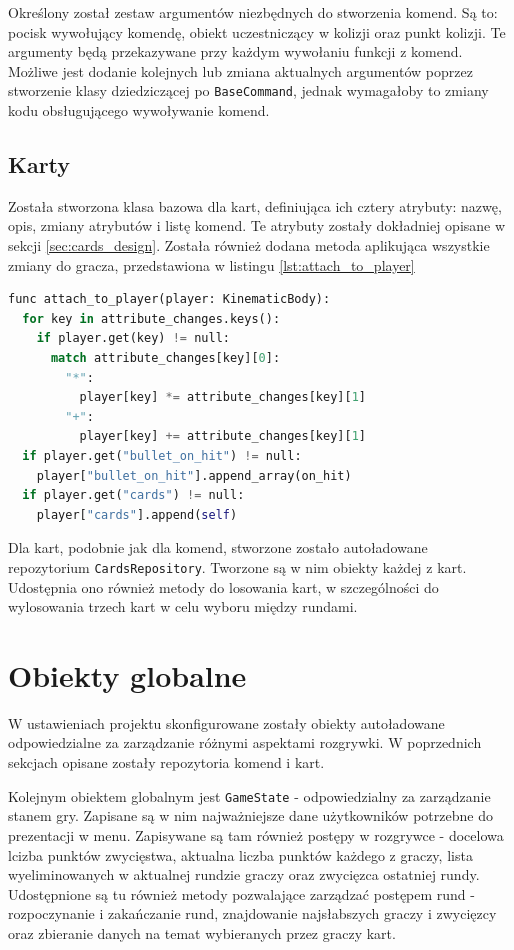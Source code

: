 Określony został zestaw argumentów niezbędnych do stworzenia komend. Są to: pocisk wywołujący komendę, obiekt uczestniczący w kolizji oraz punkt kolizji. Te argumenty będą przekazywane przy każdym wywołaniu funkcji z komend. Możliwe jest dodanie kolejnych lub zmiana aktualnych argumentów poprzez stworzenie klasy dziedziczącej po \texttt{BaseCommand}, jednak wymagałoby to zmiany kodu obsługującego wywoływanie komend.


\subsection{Karty}
Została stworzona klasa bazowa dla kart, definiująca ich cztery atrybuty: nazwę, opis, zmiany atrybutów i listę komend. Te atrybuty zostały dokładniej opisane w sekcji \ref{sec:cards_design}. Została również dodana metoda aplikująca wszystkie zmiany do gracza, przedstawiona w listingu \ref{lst:attach_to_player}

\begin{lstlisting}[language=python,caption=Metoda aplikująca zmiany atrybutów gracza., label=lst:attach_to_player,basicstyle=\footnotesize\ttfamily]
func attach_to_player(player: KinematicBody):
  for key in attribute_changes.keys():
    if player.get(key) != null:
      match attribute_changes[key][0]:
        "*":
          player[key] *= attribute_changes[key][1]
        "+":
          player[key] += attribute_changes[key][1]
  if player.get("bullet_on_hit") != null:
    player["bullet_on_hit"].append_array(on_hit)
  if player.get("cards") != null:
    player["cards"].append(self)
\end{lstlisting}

Dla kart, podobnie jak dla komend, stworzone zostało autoładowane repozytorium \texttt{CardsRepository}. Tworzone są w nim obiekty każdej z kart. Udostępnia ono również metody do losowania kart, w szczególności do wylosowania trzech kart w celu wyboru między rundami.  

\section{Obiekty globalne}
W ustawieniach projektu skonfigurowane zostały obiekty autoładowane odpowiedzialne za zarządzanie różnymi aspektami rozgrywki. W poprzednich sekcjach opisane zostały repozytoria komend i kart. 

Kolejnym obiektem globalnym jest \texttt{GameState} - odpowiedzialny za zarządzanie stanem gry. Zapisane są w nim najważniejsze dane użytkowników potrzebne do prezentacji w menu. Zapisywane są tam również postępy w rozgrywce - docelowa lcizba punktów zwycięstwa, aktualna liczba punktów każdego z graczy, lista wyeliminowanych w aktualnej rundzie graczy oraz zwycięzca ostatniej rundy. Udostępnione są tu również metody pozwalające zarządzać postępem rund - rozpoczynanie i zakańczanie rund, znajdowanie najsłabszych graczy i zwycięzcy oraz zbieranie danych na temat wybieranych przez graczy kart.

